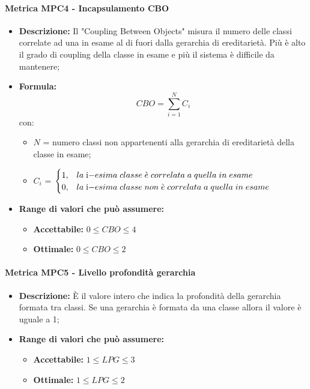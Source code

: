     \paragraph{Metrica MPC4 - Incapsulamento CBO}
    \begin{itemize}
        \item \textbf{Descrizione:} Il "Coupling Between Objects" misura il numero delle classi correlate ad una in esame al di fuori dalla gerarchia di ereditarietà. Più è alto il grado di coupling della classe in esame e più il sistema è difficile da mantenere;
        \item \textbf{Formula:} $$CBO = {\sum_{i=1}^{N} C_i}$$
        con:
        \begin{itemize}
            \item $N$ = numero classi non appartenenti alla gerarchia di ereditarietà della classe in esame;
            \item $C_i$ =
            \begin{math} {
                \begin{cases}
                    1, & la \; $i$-esima \; classe \; \grave{e} \; correlata \; a \; quella \; in \; esame \\
                    0, & la \; $i$-esima \; classe \; non \; \grave{e} \; correlata \; a \; quella \; in \; esame
                \end{cases}
            }
            \end{math}
        \end{itemize}
        \item \textbf{Range di valori che può assumere:}
        \begin{itemize}
            \item \textbf{Accettabile:} $0 \leq{} CBO \leq 4$
            \item \textbf{Ottimale:} $0 \leq{} CBO \leq 2$
        \end{itemize}
    \end{itemize}

    \paragraph{Metrica MPC5 - Livello profondità gerarchia}
    \begin{itemize}
        \item \textbf{Descrizione:} È il valore intero che indica la profondità della gerarchia formata tra classi. Se una gerarchia è formata da una classe allora il valore è uguale a 1;
        \item \textbf{Range di valori che può assumere:}
        \begin{itemize}
            \item \textbf{Accettabile:} $1 \leq{} LPG \leq 3$
            \item \textbf{Ottimale:} $1 \leq{} LPG \leq 2$
        \end{itemize}
    \end{itemize}

